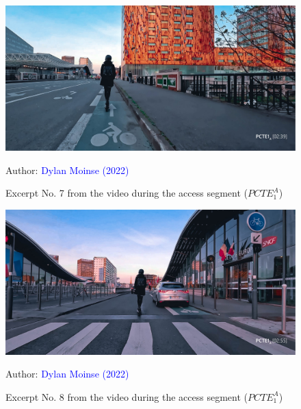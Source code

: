     \begin{figure}[h!]\vspace*{4pt}
        \caption*{Excerpt No. 7 from the video during the access segment (\(PCTE^{A}_{1}\))}
        \centerline{\includegraphics[width=0.75\columnwidth]{src/Figures/Annexes/Extrait_Video_PCTE1_Access_7.jpg}}
        \vspace{5pt}
        \begin{flushright}\scriptsize{
        Author: \textcolor{blue}{Dylan Moinse (2022)}
        }\end{flushright}
    \end{figure}

    \begin{figure}[h!]\vspace*{4pt}
        \caption*{Excerpt No. 8 from the video during the access segment (\(PCTE^{A}_{1}\))}
        \centerline{\includegraphics[width=0.75\columnwidth]{src/Figures/Annexes/Extrait_Video_PCTE1_Access_8.jpg}}
        \vspace{5pt}
        \begin{flushright}\scriptsize{
        Author: \textcolor{blue}{Dylan Moinse (2022)}
        }\end{flushright}
    \end{figure}

